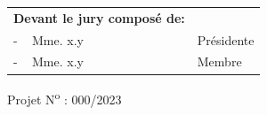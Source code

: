 \begin{centering}
  \vspace*{0.5cm}
  
  \begin{table}[h]
    \begin{tabular}{p{6.5cm}p{5cm}}
      \textbf{Devant le jury composé de:}&\\
        - \,\,\, Mme. x.y         & Présidente \\
        - \,\,\, Mme. x.y           & Membre \\
    \end{tabular}
  \end{table}
  \vspace*{1.7cm}
  \begin{center}
    Projet N\textsuperscript{o} : 000/2023
  \end{center}
\end{centering}



